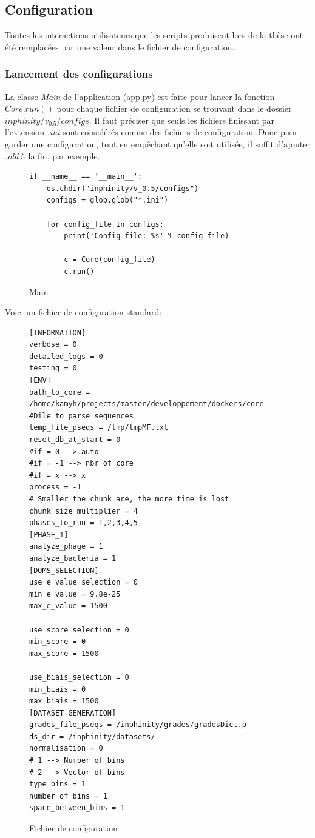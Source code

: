 \subsection{Configuration}
\label{ch:config}

Toutes les interactions utilisateurs que les scripts produisent lors de la thèse \thLeite ont été remplacées par une valeur dans le fichier de configuration.

\subsubsection{Lancement des configurations}

La classe \emph{Main} de l'application (app.py) est faite pour lancer la fonction \emph{$Core.run()$} pour chaque fichier de configuration se trouvant dans le dossier \emph{$inphinity/v_0.5/configs$}. Il faut préciser que seuls les fichiers finissant par l'extension \emph{.ini} sont considérés comme des fichiers de configuration. Donc pour garder une configuration, tout en empêchant qu'elle soit utilisée, il suffit d'ajouter \emph{.old} à la fin, par exemple.

\begin{figure}[H] 
\centering 
\begin{lstlisting}[frame=single]
if __name__ == '__main__':
    os.chdir("inphinity/v_0.5/configs")
    configs = glob.glob("*.ini")

    for config_file in configs:
        print('Config file: %s' % config_file)

        c = Core(config_file)
        c.run()
\end{lstlisting}
\caption[Main]{Main}
\label{fig:main} 
\end{figure}

Voici un fichier de configuration standard:

\begin{figure}[H] 
\centering 
\begin{lstlisting}[frame=single]
[INFORMATION]
verbose = 0
detailed_logs = 0
testing = 0
[ENV]
path_to_core = /home/kamyh/projects/master/developpement/dockers/core
#Dile to parse sequences
temp_file_pseqs = /tmp/tmpMF.txt
reset_db_at_start = 0
#if = 0 --> auto
#if = -1 --> nbr of core
#if = x --> x
process = -1
# Smaller the chunk are, the more time is lost
chunk_size_multiplier = 4
phases_to_run = 1,2,3,4,5
[PHASE_1]
analyze_phage = 1
analyze_bacteria = 1
[DOMS_SELECTION]
use_e_value_selection = 0
min_e_value = 9.8e-25
max_e_value = 1500

use_score_selection = 0
min_score = 0
max_score = 1500

use_biais_selection = 0
min_biais = 0
max_biais = 1500
[DATASET_GENERATION]
grades_file_pseqs = /inphinity/grades/gradesDict.p
ds_dir = /inphinity/datasets/
normalisation = 0
# 1 --> Number of bins
# 2 --> Vector of bins
type_bins = 1
number_of_bins = 1
space_between_bins = 1
\end{lstlisting}
\caption[Fichier de configuration]{Fichier de configuration}
\label{fig:configFile} 
\end{figure}

